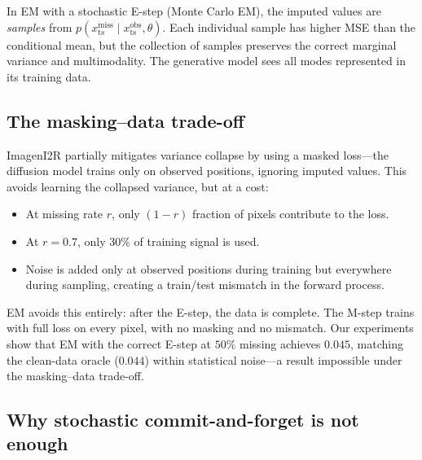 \documentclass{article}
\theoremstyle{plain}
\theoremstyle{definition}
\theoremstyle{remark}
\newcommand{\xts}{x_{\mathrm{ts}}}
\begin{document}
In EM with a stochastic E-step (Monte Carlo EM), the imputed values are \emph{samples} from $p(\xts^{\mathrm{miss}} \mid \xts^{\mathrm{obs}}, \theta)$. Each individual sample has higher MSE than the conditional mean, but the collection of samples preserves the correct marginal variance and multimodality. The generative model sees all modes represented in its training data.

\subsection{The masking--data trade-off}
\label{app:masking-tradeoff}

ImagenI2R partially mitigates variance collapse by using a masked loss---the diffusion model trains only on observed positions, ignoring imputed values. This avoids learning the collapsed variance, but at a cost:
\begin{itemize}
\setlength{\itemsep}{0pt}
\item At missing rate $r$, only $(1-r)$ fraction of pixels contribute to the loss.
\item At $r = 0.7$, only $30\%$ of training signal is used.
\item Noise is added only at observed positions during training but everywhere during sampling, creating a train/test mismatch in the forward process.
\end{itemize}
EM avoids this entirely: after the E-step, the data is complete. The M-step trains with full loss on every pixel, with no masking and no mismatch. Our experiments show that EM with the correct E-step at $50\%$ missing achieves $0.045$, matching the clean-data oracle ($0.044$) within statistical noise---a result impossible under the masking--data trade-off.

\subsection{Why stochastic commit-and-forget is not enough}
\label{app:frozen-stochastic}
\end{document}
